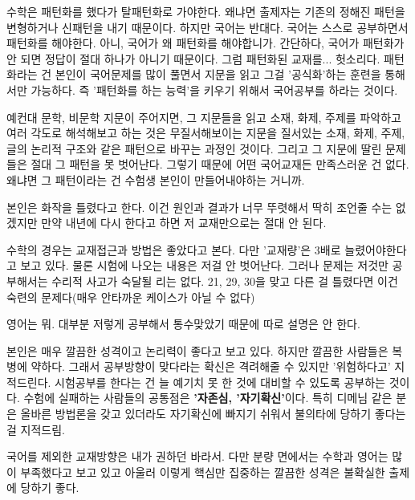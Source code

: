 수학은 패턴화를 했다가 탈패턴화로 가야한다. 왜냐면 출제자는 기존의 정해진 패턴을 변형하거나 신패턴을 내기 때문이다.
하지만 국어는 반대다. 국어는 스스로 공부하면서 패턴화를 해야한다.
아니, 국어가 왜 패턴화를 해야합니가. 간단하다, 국어가 패턴화가 안 되면 정답이 절대 하나가 아니기 때문이다.
그럼 패턴화된 교재를... 헛소리다. 패턴화라는 건 본인이 국어문제를 많이 풀면서 지문을 읽고 그걸 '공식화'하는 훈련을 통해서만 가능하다.
즉 '패턴화를 하는 능력'을 키우기 위해서 국어공부를 하라는 것이다.
\vspace{5mm}

예컨대 문학, 비문학 지문이 주어지면, 그 지문들을 읽고 소재, 화제, 주제를 파악하고 여러 각도로 해석해보고 하는 것은
무질서해보이는 지문을 질서있는 소재, 화제, 주제, 글의 논리적 구조와 같은 패턴으로 바꾸는 과정인 것이다.
그리고 그 지문에 딸린 문제들은 절대 그 패턴을 못 벗어난다.
그렇기 때문에 어떤 국어교재든 만족스러운 건 없다. 왜냐면 그 패턴이라는 건 수험생 본인이 만들어내야하는 거니까.
\vspace{5mm}

본인은 화작을 틀렸다고 한다. 이건 원인과 결과가 너무 뚜렷해서 딱히 조언줄 수는 없겠지만
만약 내년에 다시 한다고 하면 저 교재만으로는 절대 안 된다.
\vspace{5mm}

수학의 경우는 교재접근과 방법은 좋았다고 본다. 다만 '교재량'은 3배로 늘렸어야한다고 보고 있다.
물론 시험에 나오는 내용은 저걸 안 벗어난다. 그러나 문제는 저것만 공부해서는 수리적 사고가 숙달될 리는 없다.
21, 29, 30을 맞고 다른 걸 틀렸다면 이건 숙련의 문제다(매우 안타까운 케이스가 아닐 수 없다)
\vspace{5mm}

영어는 뭐. 대부분 저렇게 공부해서 통수맞았기 때문에 따로 설명은 안 한다.
\vspace{5mm}

본인은 매우 깔끔한 성격이고 논리력이 좋다고 보고 있다. 하지만 깔끔한 사람들은 복병에 약하다.
그래서 공부방향이 맞다라는 확신은 격려해줄 수 있지만 '위험하다고' 지적드린다.
시험공부를 한다는 건 늘 예기치 못 한 것에 대비할 수 있도록 공부하는 것이다.
수험에 실패하는 사람들의 공통점은 \textbf{'자존심, '자기확신'}이다.
특히 디메님 같은 분은 올바른 방법론을 갖고 있더라도 자기확신에 빠지기 쉬워서 불의타에 당하기 좋다는 걸 지적드림.
\vspace{5mm}

국어를 제외한 교재방향은 내가 권하던 바라서.
다만 분량 면에서는 수학과 영어는 많이 부족했다고 보고 있고
아울러 이렇게 핵심만 집중하는 깔끔한 성격은 불확실한 출제에 당하기 좋다.
\vspace{5mm}




